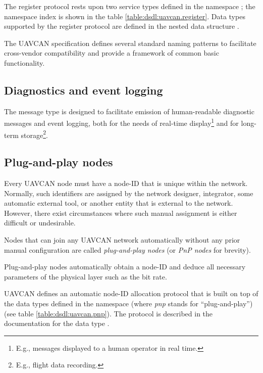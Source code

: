 The register protocol rests upon two service types defined in the namespace ;
the namespace index is shown in the table \ref{table:dsdl:uavcan.register}.
Data types supported by the register protocol are defined in the nested data structure
.

The UAVCAN specification defines several standard naming patterns to facilitate cross-vendor compatibility
and provide a framework of common basic functionality.


\subsection{Diagnostics and event logging}

The message type  is designed to facilitate emission of
human-readable diagnostic messages and event logging,
both for the needs of real-time display\footnote{E.g., messages displayed to a human operator in real time.}
and for long-term storage\footnote{E.g., flight data recording.}.

\subsection{Plug-and-play nodes}

Every UAVCAN node must have a node-ID that is unique within the network.
Normally, such identifiers are assigned by the network designer, integrator, some automatic external tool,
or another entity that is external to the network.
However, there exist circumstances where such manual assignment is either difficult or undesirable.

Nodes that can join any UAVCAN network automatically without any prior manual configuration
are called \emph{plug-and-play nodes} (or \emph{PnP nodes} for brevity).

Plug-and-play nodes automatically obtain a node-ID and deduce all necessary parameters of the physical layer
such as the bit rate.

UAVCAN defines an automatic node-ID allocation protocol that is built on top of the data types defined in the
namespace  (where \emph{pnp} stands for ``plug-and-play'')
(see table \ref{table:dsdl:uavcan.pnp}).
The protocol is described in the documentation for the data type .

